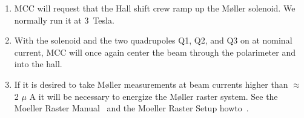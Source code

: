 {\begin{enumerate}
        \item MCC will request that the Hall shift crew ramp up the
	M\o ller solenoid. We normally run it at 3~Tesla.

        \item With the solenoid and the two quadrupoles Q1, Q2, and Q3 on
              at nominal current, MCC will once again center the beam
              through the polarimeter and into the hall.

	\item If it is desired to take M\o ller measurements at beam currents
	      higher than $\approx$ 2 $\mu$ A it will be necessary to energize
	      the M\o ller raster system. See the Moeller Raster
              Manual~\cite{docdb:moellerraster} and the
              Moeller Raster Setup howto~\cite{howto:moeller_raster}.
\end{enumerate}


}


